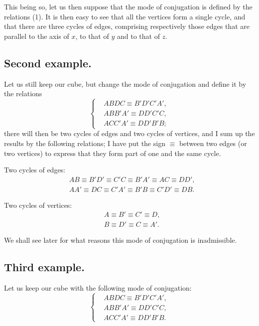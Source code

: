 \documentclass{article}
\begin{document}
This being so, let us then suppose that the mode of conjugation is defined by the relations (1). It is then easy to see that all the vertices form a single cycle, and that there are three cycles of edges, comprising respectively those edges that are parallel to the axis of $x$, to that of $y$ and to that of $z$.

\subsection*{Second example.}

Let us still keep our cube, but change the mode of conjugation and define it by the relations
\[ \left\{ \begin{aligned} &ABDC \equiv B'D'C'A',\\ &ABB'A' \equiv DD'C'C,\\ &ACC'A' \equiv DD'B'B; \end{aligned} \right. \tag{2} \]
there will then be two cycles of edges and two cycles of vertices, and I sum up the results by the following relations; I have put the sign $\equiv$ between two edges (or two vertices) to express that they form part of one and the same cycle.

Two cycles of edges:
\[ \begin{aligned} &AB \equiv B'D' \equiv C'C \equiv B'A' \equiv AC \equiv DD',\\ &AA' \equiv DC \equiv C'A' \equiv B'B \equiv C'D' \equiv DB. \end{aligned} \]

Two cycles of vertices:
\[ \begin{aligned} &A \equiv B' \equiv C' \equiv D,\\ &B \equiv D' \equiv C \equiv A'. \end{aligned} \]

We shall see later for what reasons this mode of conjugation is inadmissible.

\subsection*{Third example.}

Let us keep our cube with the following mode of conjugation:
\[ \left\{ \begin{aligned} &ABDC \equiv B'D'C'A',\\ &ABB'A' \equiv DD'C'C,\\ &ACC'A' \equiv DD'B'B. \end{aligned} \right. \tag{3} \]
\end{document}
